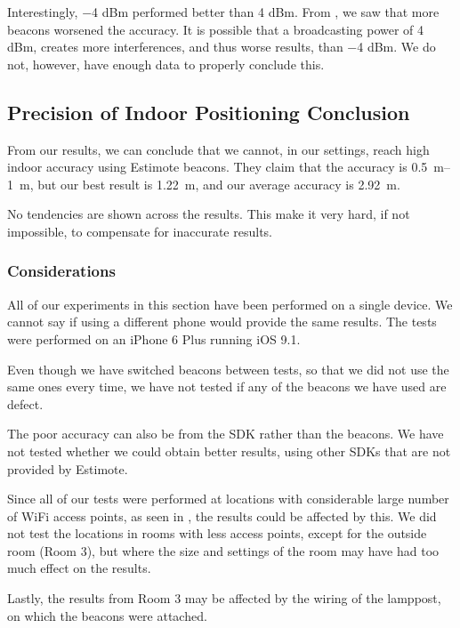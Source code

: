 Interestingly, \num{-4} dBm performed better than \num{4} dBm.
From , we saw that more beacons worsened the accuracy. 
It is possible that a broadcasting power of \num{4} dBm,
creates more interferences, and thus worse results, than \num{-4} dBm. 
We do not, however, have enough data to properly conclude this. 

\subsection{Precision of Indoor Positioning Conclusion}
From our results, we can conclude that we cannot, 
in our settings, reach high indoor accuracy using Estimote beacons. 
They claim that the accuracy is \SIrange{0.5}{1}{\meter}, 
but our best result is \SI{1.22}{\meter}, 
and our average accuracy is \SI{2.92}{\meter}.

No tendencies are shown across the results. 
This make it very hard, if not impossible,
to compensate for inaccurate results.  

\subsubsection{Considerations}
All of our experiments in this section have been performed on a single device.
We cannot say if using a different phone would provide the same results.
The tests were performed on an iPhone 6 Plus running iOS 9.1.

Even though we have switched beacons between tests, 
so that we did not use the same ones every time, 
we have not tested if any of the beacons we have used are defect. 

The poor accuracy can also be from the SDK rather than the beacons. 
We have not tested whether we could obtain better results, 
using other SDKs that are not provided by Estimote. 

Since all of our tests were performed at locations with considerable large number of WiFi access points, as seen in ,
the results could be affected by this. 
We did not test the locations in rooms with less access points, 
except for the outside room (Room 3), 
but where the size and settings of the room may have had too much effect on the results.

Lastly, the results from Room 3 may be affected by the wiring of the lamppost, 
on which the beacons were attached.